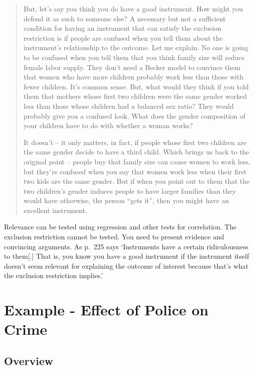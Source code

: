 \documentclass[
]{book}
\begin{document}
\begin{quote}
But, let's say you think you do have a good instrument. How might you defend it as such to someone else? A necessary but not a sufficient condition for having an instrument that can satisfy the exclusion restriction is if people are confused when you tell them about the instrument's relationship to the outcome. Let me explain. No one is going to be confused when you tell them that you think family size will reduce female labor supply. They don't need a Becker model to convince them that women who have more children probably work less than those with fewer children. It's common sense. But, what would they think if you told them that mothers whose first two children were the same gender worked less than those whose children had a balanced sex ratio? They would probably give you a confused look. What does the gender composition of your children have to do with whether a woman works?

It doesn't -- it only matters, in fact, if people whose first two children are the same gender decide to have a third child. Which brings us back to the original point -- people buy that family size can cause women to work less, but they're confused when you say that women work less when their first two kids are the same gender. But if when you point out to them that the two children's gender induces people to have larger families than they would have otherwise, the person
``gets it'', then you might have an excellent instrument.
\end{quote}

Relevance can be tested using regression and other tests for correlation. The exclusion restriction cannot be tested. You need to present evidence and convincing arguments. As \citet{cunninghamnorap} p.~225 says `Instruments have a certain ridiculousness to them{[}.{]} That is, you know you have a good instrument if the instrument itself doesn't seem relevant for explaining the outcome of interest because that's what the exclusion restriction implies.'

\hypertarget{example---effect-of-police-on-crime}{%
\section{Example - Effect of Police on Crime}\label{example---effect-of-police-on-crime}}

\hypertarget{overview}{%
\subsection{Overview}\label{overview}}
\end{document}
